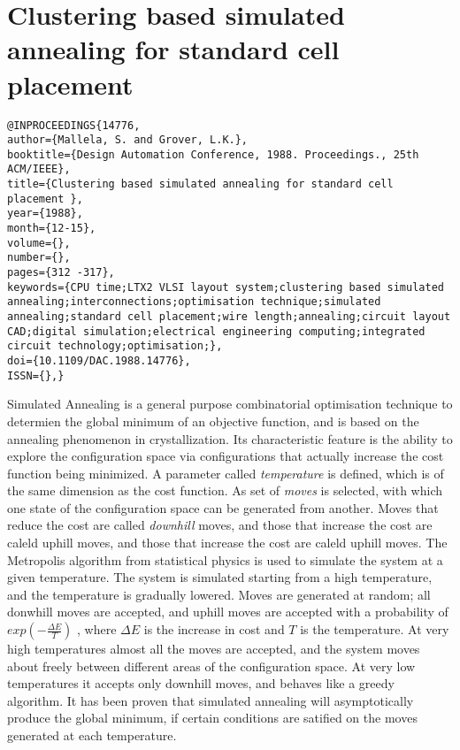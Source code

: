 \documentclass[pdftex,11pt]{article}
\begin{document}
\section*{Clustering based simulated annealing for standard cell placement}
\begin{verbatim}
@INPROCEEDINGS{14776, 
author={Mallela, S. and Grover, L.K.}, 
booktitle={Design Automation Conference, 1988. Proceedings., 25th ACM/IEEE}, 
title={Clustering based simulated annealing for standard cell placement }, 
year={1988}, 
month={12-15}, 
volume={}, 
number={}, 
pages={312 -317}, 
keywords={CPU time;LTX2 VLSI layout system;clustering based simulated annealing;interconnections;optimisation technique;simulated annealing;standard cell placement;wire length;annealing;circuit layout CAD;digital simulation;electrical engineering computing;integrated circuit technology;optimisation;}, 
doi={10.1109/DAC.1988.14776}, 
ISSN={},}
\end{verbatim}

Simulated Annealing is a general purpose combinatorial optimisation technique to determien the global minimum of an objective function, and is based on the annealing phenomenon in crystallization. Its characteristic feature is the ability to explore the configuration space via configurations that actually increase the cost function being minimized. A parameter called \emph{temperature} is defined, which is of the same dimension as the cost function. As set of \emph{moves} is selected, with which one state of the configuration space can be generated from another. Moves that reduce the cost are called \emph{downhill} moves, and those that increase the cost are caleld uphill moves, and those that increase the cost are caleld uphill moves. The Metropolis algorithm from statistical physics is used to simulate the system at a given temperature. The system is simulated starting from a high temperature, and the temperature is gradually lowered. Moves are generated at random; all donwhill moves are accepted, and uphill moves are accepted with a probability of $exp(-\frac{\Delta E}{T})$ , where $\Delta E$ is the increase in cost and $T$ is the temperature. At very high temperatures almost all the moves are accepted, and the system moves about freely between different areas of the configuration space. At very low temperatures it accepts only downhill moves, and behaves like a greedy algorithm. It has been proven that simulated annealing will asymptotically produce the global minimum, if certain conditions are satified on the moves generated at each temperature.
\end{document}

